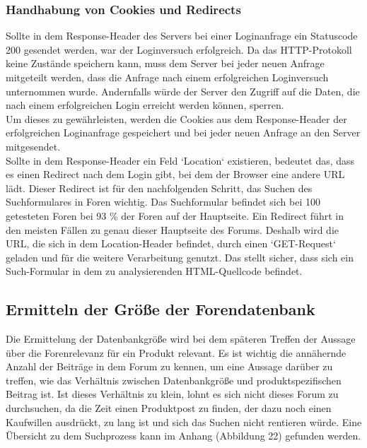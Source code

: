 \subsubsection{Handhabung von Cookies und Redirects}
Sollte in dem Response-Header des Servers bei einer Loginanfrage ein Statuscode 200 gesendet werden, war der Loginversuch erfolgreich. Da das HTTP-Protokoll keine Zustände speichern kann, muss dem Server bei jeder neuen Anfrage mitgeteilt werden, dass die Anfrage nach einem erfolgreichen Loginversuch unternommen wurde. Andernfalls würde der Server den Zugriff auf die Daten, die nach einem erfolgreichen Login erreicht werden können, sperren.\\
Um dieses zu gewährleisten, werden die Cookies aus dem Response-Header der erfolgreichen Loginanfrage gespeichert und bei jeder neuen Anfrage an den Server mitgesendet.\\
Sollte in dem Response-Header ein Feld `Location` existieren, bedeutet das, dass es einen Redirect nach dem Login gibt, bei dem der Browser eine andere URL lädt. Dieser Redirect ist für den nachfolgenden Schritt, das Suchen des Suchformulares in Foren wichtig. Das Suchformular befindet sich bei 100 getesteten Foren bei 93 \% der Foren auf der Hauptseite. Ein Redirect führt in den meisten Fällen zu genau dieser Hauptseite des Forums. Deshalb wird die URL, die sich in dem Location-Header befindet, durch einen `GET-Request` geladen und für die weitere Verarbeitung genutzt. Das stellt sicher, dass sich ein Such-Formular in dem zu analysierenden HTML-Quellcode befindet.


\subsection{Ermitteln der Größe der Forendatenbank}
Die Ermittelung der Datenbankgröße wird bei dem späteren Treffen der Aussage über die Forenrelevanz für ein Produkt relevant.
Es ist wichtig die annähernde Anzahl der Beiträge in dem Forum zu kennen, um eine Aussage darüber zu treffen, wie das Verhältnis zwischen Datenbankgröße und produktspezifischen Beitrag ist. Ist dieses Verhältnis zu klein, lohnt es sich nicht dieses Forum zu durchsuchen, da die Zeit einen Produktpost zu finden, der dazu noch einen Kaufwillen ausdrückt, zu lang ist und sich das Suchen nicht rentieren würde.
Eine Übersicht zu dem Suchprozess kann im Anhang (Abbildung 22) gefunden werden.
